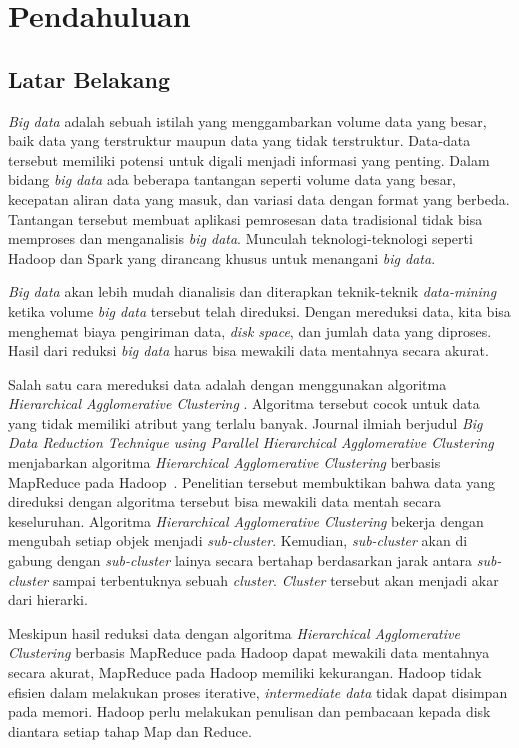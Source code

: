 \chapter{Pendahuluan}
\label{chap:intro}
   
\section{Latar Belakang}
\label{sec:label}

{\it Big data} adalah sebuah istilah yang menggambarkan volume data yang besar, baik data yang terstruktur maupun data yang tidak terstruktur. Data-data tersebut memiliki potensi untuk digali menjadi informasi yang penting. Dalam bidang {\it big data} ada  beberapa tantangan seperti volume data yang besar, kecepatan aliran data yang masuk, dan variasi data dengan format yang berbeda. Tantangan tersebut membuat aplikasi pemrosesan data tradisional  tidak bisa memproses dan menganalisis {\it big data}. Munculah teknologi-teknologi seperti Hadoop dan Spark yang dirancang khusus untuk menangani {\it big data}. 

{\it Big data} akan lebih mudah dianalisis dan diterapkan teknik-teknik {\it data-mining} ketika volume {\it big data} tersebut telah direduksi. Dengan mereduksi data, kita bisa menghemat biaya pengiriman data, {\it disk space}, dan jumlah data yang diproses. Hasil dari reduksi {\it big data} harus bisa mewakili data mentahnya secara akurat. 

Salah satu cara mereduksi data adalah dengan menggunakan algoritma {\it Hierarchical Agglomerative Clustering }. Algoritma tersebut cocok untuk data yang tidak memiliki atribut yang terlalu banyak. Journal ilmiah berjudul {\it Big Data Reduction Technique using Parallel Hierarchical Agglomerative Clustering} menjabarkan algoritma {\it Hierarchical Agglomerative Clustering} berbasis MapReduce pada Hadoop~\cite{veronica:02:bdhca}. Penelitian tersebut membuktikan bahwa data yang direduksi dengan algoritma tersebut bisa mewakili data mentah secara keseluruhan. Algoritma {\it Hierarchical Agglomerative Clustering} bekerja dengan mengubah setiap objek menjadi {\it sub-cluster}. Kemudian, {\it sub-cluster} akan di gabung dengan {\it sub-cluster} lainya secara bertahap berdasarkan jarak antara {\it sub-cluster} sampai terbentuknya sebuah \textit{cluster}. {\it Cluster} tersebut akan menjadi akar dari hierarki.

Meskipun hasil reduksi data dengan algoritma {\it Hierarchical Agglomerative Clustering} berbasis MapReduce pada Hadoop dapat mewakili data mentahnya secara akurat, MapReduce pada Hadoop memiliki kekurangan. Hadoop tidak efisien dalam melakukan proses iterative, {\it intermediate data} tidak dapat disimpan pada memori. Hadoop perlu melakukan penulisan dan pembacaan kepada disk diantara setiap tahap Map dan Reduce.

